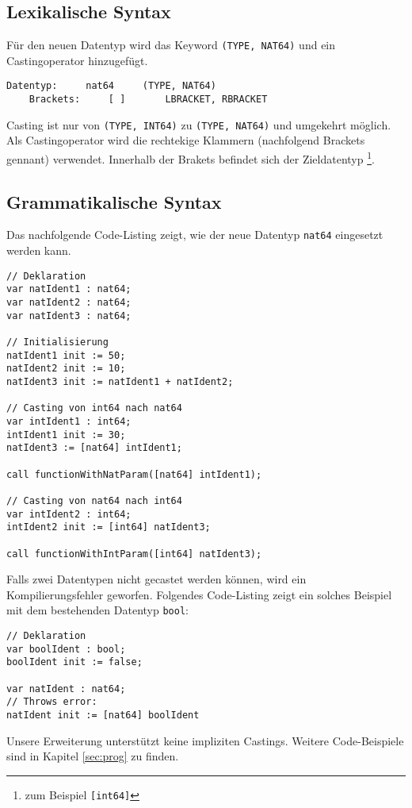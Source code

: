 \documentclass[10pt, a4paper, twocolumn]{article} %
\begin{document}
\subsection{Lexikalische Syntax}
Für den neuen Datentyp wird das Keyword \texttt{(TYPE, NAT64)} und ein Castingoperator hinzugefügt.

\begin{lstlisting}[backgroundcolor = \color{lightgray},
xleftmargin = 0.05cm,
framexleftmargin = 0.05em]
    Datentyp:     nat64     (TYPE, NAT64)
    Brackets:     [ ]       LBRACKET, RBRACKET
\end{lstlisting}

Casting ist nur von \texttt{(TYPE, INT64)} zu \texttt{(TYPE, NAT64)} und umgekehrt möglich.
Als Castingoperator wird die rechtekige Klammern (nachfolgend Brackets gennant) verwendet.
Innerhalb der Brakets befindet sich der Zieldatentyp \footnote{zum Beispiel \texttt{[int64]}}.

\subsection{Grammatikalische Syntax}
Das nachfolgende Code-Listing zeigt, wie der neue Datentyp \texttt{nat64} eingesetzt werden kann.
\begin{lstlisting}
// Deklaration
var natIdent1 : nat64;
var natIdent2 : nat64;
var natIdent3 : nat64;

// Initialisierung
natIdent1 init := 50;
natIdent2 init := 10;
natIdent3 init := natIdent1 + natIdent2;

// Casting von int64 nach nat64
var intIdent1 : int64;
intIdent1 init := 30;
natIdent3 := [nat64] intIdent1;

call functionWithNatParam([nat64] intIdent1);

// Casting von nat64 nach int64
var intIdent2 : int64;
intIdent2 init := [int64] natIdent3;

call functionWithIntParam([int64] natIdent3);
\end{lstlisting}
Falls zwei Datentypen nicht gecastet werden können, wird ein Kompilierungsfehler geworfen.
Folgendes Code-Listing zeigt ein solches Beispiel mit dem bestehenden Datentyp \texttt{bool}:
\begin{lstlisting}
// Deklaration
var boolIdent : bool;
boolIdent init := false;

var natIdent : nat64;
// Throws error:
natIdent init := [nat64] boolIdent
\end{lstlisting}
Unsere Erweiterung unterstützt keine impliziten Castings.
Weitere Code-Beispiele sind in Kapitel \ref{sec:prog} zu finden.
\end{document}
